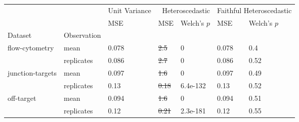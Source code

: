 \begin{tabular}{ll|l|ll|ll}
\toprule
 &  & Unit Variance & \multicolumn{2}{r}{Heteroscedastic} & \multicolumn{2}{r}{Faithful Heteroscedastic} \\
 &  & MSE & MSE & Welch's $p$ & MSE & Welch's $p$ \\
Dataset & Observation &  &  &  &  &  \\
\midrule
\multirow[c]{2}{*}{flow-cytometry} & mean & 0.078 & \sout{2.5} & 0 & 0.078 & 0.4 \\
 & replicates & 0.086 & \sout{2.7} & 0 & 0.086 & 0.52 \\
\multirow[c]{2}{*}{junction-targets} & mean & 0.097 & \sout{1.6} & 0 & 0.097 & 0.49 \\
 & replicates & 0.13 & \sout{0.18} & 6.4e-132 & 0.13 & 0.52 \\
\multirow[c]{2}{*}{off-target} & mean & 0.094 & \sout{1.6} & 0 & 0.094 & 0.51 \\
 & replicates & 0.12 & \sout{0.21} & 2.3e-181 & 0.12 & 0.55 \\
\bottomrule
\end{tabular}
